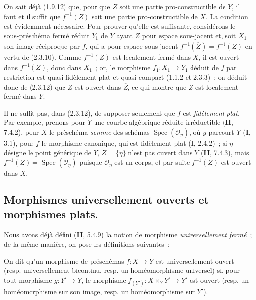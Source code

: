 On sait déjà (1.9.12) que, pour que $Z$ soit une partie pro-constructible de
$Y$, il faut et il suffit que $f^{-1}(Z)$ soit une partie pro-constructible de
$X$. La condition est évidemment nécessaire. Pour prouver qu'elle est
suffisante, considérons le sous-préschéma fermé réduit $Y_1$ de $Y$ ayant
$\overline Z$ pour espace sous-jacent et, soit $X_1$ son image réciproque par
$f$, qui a pour espace sous-jacent
$f^{-1}(\overline Z)=\overline{f^{-1}(Z)}$ en vertu de (2.3.10). Comme
$f^{-1}(Z)$ est localement fermé dans $X$, il est ouvert dans
$\overline{f^{-1}(Z)}$, donc dans $X_1$~; or, le morphisme $f_1:X_1\to Y_1$
déduit de $f$ par restriction est quasi-fidèlement plat et quasi-compact
(1.1.2 et 2.3.3)~; on déduit donc de (2.3.12) que $Z$ est ouvert dans
$\overline Z$, ce qui montre que $Z$ est localement fermé dans $Y$.

\begin{remark}[2.3.15]
\label{IV.2.3.15-fr}
Il ne suffit pas, dans (2.3.12), de supposer seulement que $f$ est \emph{fidèlement
plat}. Par exemple, prenons pour $Y$ une courbe algébrique réduite irréductible
(\textbf{II}, 7.4.2), pour $X$ le préschéma \emph{somme} des schémas
$\operatorname{Spec}(\mathcal O_y)$, où $y$ parcourt $Y$ (\textbf{I}, 3.1), pour $f$ le
morphisme canonique, qui est fidèlement plat (\textbf{I}, 2.4.2)~; si $\eta$ désigne le
point générique de $Y$, $Z=\{\eta\}$ n'est pas ouvert dans $Y$ (\textbf{II}, 7.4.3),
mais $f^{-1}(Z)=\operatorname{Spec}(\mathcal O_\eta)$ puisque
$\mathcal O_\eta$ est un corps, et par suite $f^{-1}(Z)$ est ouvert dans $X$.
\end{remark}

\subsection{Morphismes universellement ouverts et morphismes plats.}

\begin{env}[2.4.1]
\label{IV.2.4.1-fr}
Nous avons déjà défini (\textbf{II}, 5.4.9) la notion de morphisme
\emph{universellement fermé}~; de la même manière, on pose les définitions
suivantes~:
\end{env}

\begin{definition}[2.4.2]
\label{IV.2.4.2-fr}
On dit qu'un morphisme de préschémas $f:X\to Y$ est universellement
ouvert \textup{(resp.} universellement bicontinu, \textup{resp.} un
homéomorphisme universel) si, pour tout morphisme $g:Y'\to Y$, le
morphisme $f_{(Y')}:X\times_Y Y'\to Y'$ est ouvert \textup{(resp.} un homéomorphisme
sur son image, \textup{resp.} un homéomorphisme sur $Y'$).
\end{definition}


